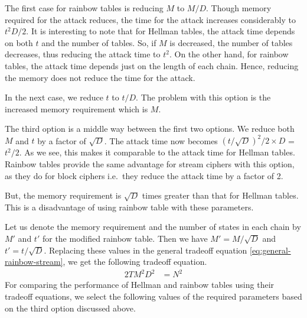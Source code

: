 The first case for rainbow tables is reducing $M$ to $M/D$. Though memory required for the attack reduces, the time for the attack increases considerably to $t^2D/2$. It is interesting to note that for Hellman tables, the attack time depends on both $t$ and the number of tables. So, if $M$ is decreased, the number of tables decreases, thus reducing the attack time to $t^2$. On the other hand, for rainbow tables, the attack time depends just on the length of each chain. Hence, reducing the memory does not reduce the time for the attack.

In the next case, we reduce $t$ to $t/D$. The problem with this option is the increased memory requirement which is $M$. 

The third option is a middle way between the first two options. We reduce both $M$ and $t$ by a factor of $\sqrt{D}$. The attack time now becomes ${(t/\sqrt{D})}^2/2 \times D$ = $t^2/2$. As we see, this makes it comparable to the attack time for Hellman tables. Rainbow tables provide the same advantage for stream ciphers with this option, as they do for block ciphers i.e.~they reduce the attack time by a factor of 2. 

But, the memory requirement is $\sqrt{D}$ times greater than that for Hellman tables. This is a disadvantage of using rainbow table with these parameters.

Let us denote the memory requirement and the number of states in each chain by $M'$ and $t'$ for the modified rainbow table. Then we have $M' = M/\sqrt{D}$ and $t' = t/\sqrt{D}$. Replacing these values in the general tradeoff equation \ref{eq:general-rainbow-stream}, we get the following tradeoff equation.
\begin{align}
\label{eq:tmdto-rainbow-stream} 2TM^2D^2 &= N^2
\end{align}
For comparing the performance of Hellman and rainbow tables using their tradeoff equations, we select the following values of the required parameters based on the third option discussed above. 

